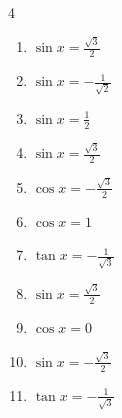 \begin{multicols}{4}
\begin{enumerate}

  \item $\displaystyle \sin{x}  = \frac{\sqrt{3}}{2}$


  \item $\displaystyle \sin{x}  = -\frac{1}{\sqrt{2}}$


  \item $\displaystyle \sin{x}  = \frac{1}{2}$


  \item $\displaystyle \sin{x}  = \frac{\sqrt{3}}{2}$


\columnbreak %

\resetques

  \item $\displaystyle \cos{x}  = -\frac{\sqrt{3}}{2}$


  \item $\displaystyle \cos{x}  = 1$


  \item $\displaystyle \tan{x}  = -\frac{1}{\sqrt{3}}$


  \item $\displaystyle \sin{x}  = \frac{\sqrt{3}}{2}$


  \item $\displaystyle \cos{x}  = 0$


  \item $\displaystyle \sin{x}  = -\frac{\sqrt{3}}{2}$


  \item $\displaystyle \tan{x}  = -\frac{1}{\sqrt{3}}$


\end{enumerate}
\end{multicols}
